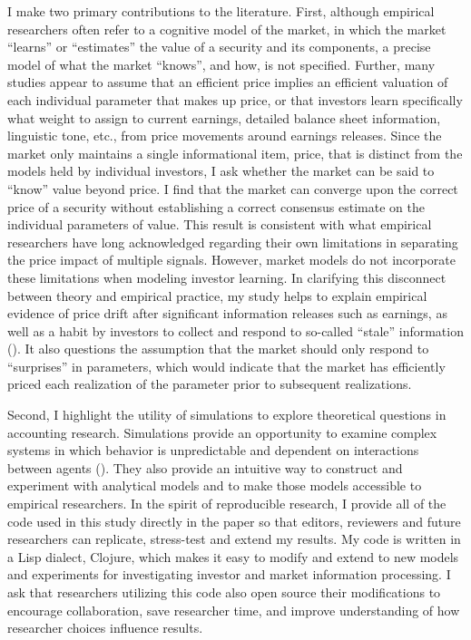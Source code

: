 \documentclass[11pt]{article}
\begin{document}
I make two primary contributions to the literature. First, although empirical researchers often refer to a cognitive model of the market, in which the market ``learns'' or ``estimates'' the value of a security and its components, a precise model of what the market ``knows'', and how, is not specified. Further, many studies appear to assume that an efficient price implies an efficient valuation of each individual parameter that makes up price, or that investors learn specifically what weight to assign to current earnings, detailed balance sheet information, linguistic tone, etc., from price movements around earnings releases. Since the market only maintains a single informational item, price, that is distinct from the models held by individual investors, I ask whether the market can be said to ``know'' value beyond price. I find that the market can converge upon the correct price of a security without establishing a correct consensus estimate on the individual parameters of value. This result is consistent with what empirical researchers have long acknowledged regarding their own limitations in separating the price impact of multiple signals. However, market models do not incorporate these limitations when modeling investor learning. In clarifying this disconnect between theory and empirical practice, my study helps to explain empirical evidence of price drift after significant information releases such as earnings, as well as a habit by investors to collect and respond to so-called ``stale'' information (\citet{tetlockAllNewsThat2011,drakeUsefulnessHistoricalAccounting2016a}). It also questions the assumption that the market should only respond to ``surprises'' in parameters, which would indicate that the market has efficiently priced each realization of the parameter prior to subsequent realizations.

Second, I highlight the utility of simulations to explore theoretical questions in accounting research. Simulations provide an opportunity to examine complex systems in which behavior is unpredictable and dependent on interactions between agents (\citet{lebaronAgentbasedComputationalFinance2000}). They also provide an intuitive way to construct and experiment with analytical models and to make those models accessible to empirical researchers. In the spirit of reproducible research, I provide all of the code used in this study directly in the paper so that editors, reviewers and future researchers can replicate, stress-test and extend my results. My code is written in a Lisp dialect, Clojure, which makes it easy to modify and extend to new models and experiments for investigating investor and market information processing. I ask that researchers utilizing this code also open source their modifications to encourage collaboration, save researcher time, and improve understanding of how researcher choices influence results.
\end{document}

